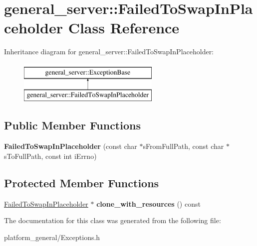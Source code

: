 \hypertarget{classgeneral__server_1_1FailedToSwapInPlaceholder}{\section{general\-\_\-server\-:\-:\-Failed\-To\-Swap\-In\-Placeholder \-Class \-Reference}
\label{classgeneral__server_1_1FailedToSwapInPlaceholder}
}
\-Inheritance diagram for general\-\_\-server\-:\-:\-Failed\-To\-Swap\-In\-Placeholder\-:\begin{figure}[H]
\begin{center}
\leavevmode
\includegraphics[height=2.000000cm]{classgeneral__server_1_1FailedToSwapInPlaceholder}
\end{center}
\end{figure}
\subsection*{\-Public \-Member \-Functions}
\begin{DoxyCompactItemize}
\item 
\hypertarget{classgeneral__server_1_1FailedToSwapInPlaceholder_a9e600abc477387b231af936147b7e56c}{{\bfseries \-Failed\-To\-Swap\-In\-Placeholder} (const char $\ast$s\-From\-Full\-Path, const char $\ast$s\-To\-Full\-Path, const int i\-Errno)}\label{classgeneral__server_1_1FailedToSwapInPlaceholder_a9e600abc477387b231af936147b7e56c}

\end{DoxyCompactItemize}
\subsection*{\-Protected \-Member \-Functions}
\begin{DoxyCompactItemize}
\item 
\hypertarget{classgeneral__server_1_1FailedToSwapInPlaceholder_a2f1391cb4a959d5a4acb09c92469c9a8}{\hyperlink{classgeneral__server_1_1FailedToSwapInPlaceholder}{\-Failed\-To\-Swap\-In\-Placeholder} $\ast$ {\bfseries clone\-\_\-with\-\_\-resources} () const }\label{classgeneral__server_1_1FailedToSwapInPlaceholder_a2f1391cb4a959d5a4acb09c92469c9a8}

\end{DoxyCompactItemize}


\-The documentation for this class was generated from the following file\-:\begin{DoxyCompactItemize}
\item 
platform\-\_\-general/\-Exceptions.\-h\end{DoxyCompactItemize}
